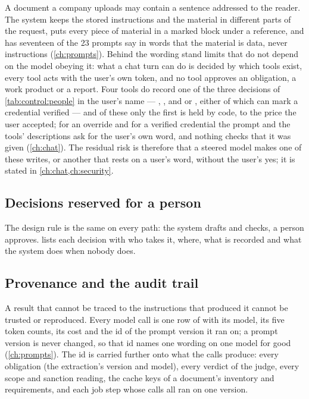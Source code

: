 A document a company uploads may contain a sentence addressed to the reader. The system
keeps the stored instructions and the material in different parts of the request, puts every
piece of material in a marked block under a reference, and has seventeen of the 23 prompts
say in words that the material is data, never instructions (\cref{ch:prompts}). Behind the
wording stand limits that do not depend on the model obeying it: what a chat turn can do is
decided by which tools exist, every tool acts with the user's own token, and no tool approves
an obligation, a work product or a report. Four tools do record one of the three decisions of
\cref{tab:control:people} in the user's name --- , ,
and  or , either of which can mark a credential
verified --- and of these only the first is held by code, to the price the user accepted; for
an override and for a verified credential the prompt and the tools' descriptions ask for the
user's own word, and nothing checks that it was given (\cref{ch:chat}). The residual risk is
therefore that a steered model makes one of these writes, or another that rests on a user's
word, without the user's yes; it is stated in \cref{ch:chat,ch:security}.

\subsection{Decisions reserved for a person}

The design rule is the same on every path: the system drafts and checks, a person approves.
 lists each decision with who takes it, where, what is recorded and
what the system does when nobody does.

\subsection{Provenance and the audit trail}\label{sec:control:provenance}

A result that cannot be traced to the instructions that produced it cannot be trusted or
reproduced. Every model call is one row of  with its model, its five token
counts, its cost and the id of the prompt version it ran on; a prompt version is never
changed, so that id names one wording on one model for good (\cref{ch:prompts}). The id is
carried further onto what the calls produce: every obligation (the extraction's version and
model), every verdict of the judge, every scope and sanction reading, the cache keys of a
document's inventory and requirements, and each job step whose calls all ran on one version.

